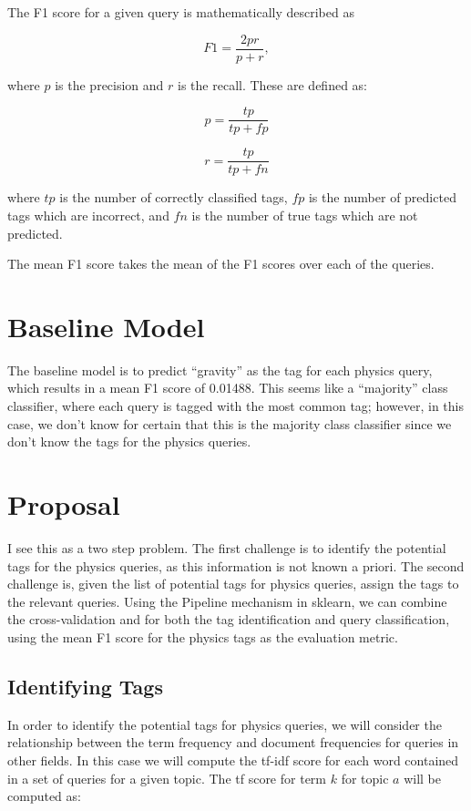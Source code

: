 \documentclass{article}
\def\eqstart{\begin{equation}}
\def\eqend{\end{equation}}
\begin{document}
The F1 score for a given query is mathematically described as

\eqstart
F1 = \frac{2 p r}{p + r},
\eqend

where \(p\) is the precision and \(r\) is the recall. These are defined as:

\eqstart
p = \frac{tp}{tp + fp}
\eqend

\eqstart
r = \frac{tp}{tp + fn}
\eqend

where \(tp\) is the number of correctly classified tags, \(fp\) is the number
of predicted tags which are incorrect, and \(fn\) is the number of true tags
which are not predicted.

The mean F1 score takes the mean of the F1 scores over each of the queries.

\section{Baseline Model}
The baseline model is to predict ``gravity'' as the tag for each physics
query, which results in a mean F1 score of 0.01488.  This seems like a 
``majority'' class classifier, where each query is tagged with the most common
tag; however, in this case, we don't know for certain that this is the
majority class classifier since we don't know the tags for the physics
queries. 

\section{Proposal}

I see this as a two step problem. The first challenge is to identify the
potential tags for the physics queries, as this information is not known a
priori. The second challenge is, given the list of potential tags for physics
queries, assign the tags to the relevant queries. Using the Pipeline mechanism
in sklearn, we can combine the cross-validation and for both the tag
identification and query classification, using the mean F1 score for the
physics tags as the evaluation metric.

\subsection{Identifying Tags}

In order to identify the potential tags for physics queries, we will consider
the relationship between the term frequency and document frequencies for
queries in other fields. In this case we will compute the tf-idf score for
each word contained in a set of queries for a given topic. The tf score for
term \(k\) for topic \(a\) will be computed as:
\end{document}
